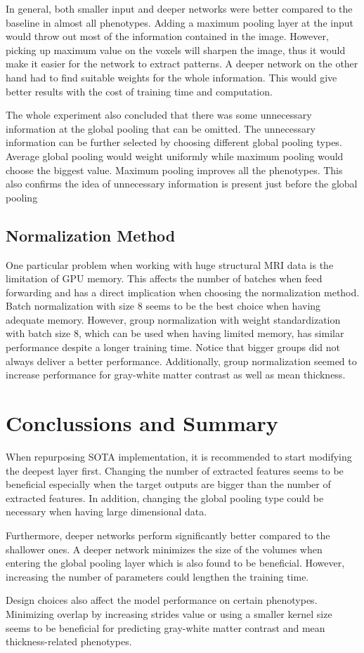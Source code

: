 \documentclass{article}
\begin{document}
    In general, both smaller input and deeper networks were better compared to the baseline in almost all phenotypes. 
    Adding a maximum pooling layer at the input would throw out most of the information contained in the image. 
    However, picking up maximum value on the voxels will sharpen the image, thus it would make it easier for the network to extract patterns. 
    A deeper network on the other hand had to find suitable weights for the whole information. 
    This would give better results with the cost of training time and computation.

    The whole experiment also concluded that there was some unnecessary information at the global pooling that can be omitted.
    The unnecessary information can be further selected by choosing different global pooling types. 
    Average global pooling would weight uniformly while maximum pooling would choose the biggest value. 
    Maximum pooling improves all the phenotypes. 
    This also confirms the idea of unnecessary information is present just before the global pooling

    \subsection*{Normalization Method}
    One particular problem when working with huge structural MRI data is the limitation of GPU memory. 
    This affects the number of batches when feed forwarding and has a direct implication when choosing the normalization method. 
    Batch normalization with size 8 seems to be the best choice when having adequate memory. 
    However, group normalization with weight standardization with batch size 8, which can be used when having limited memory, has similar performance despite a longer training time. 
    Notice that bigger groups did not always deliver a better performance. 
    Additionally, group normalization seemed to increase performance for gray-white matter contrast as well as mean thickness.

    \section*{Conclussions and Summary}
    When repurposing SOTA implementation, it is recommended to start modifying the deepest layer first. 
    Changing the number of extracted features seems to be beneficial especially when the target outputs are bigger than the number of extracted features. 
    In addition, changing the global pooling type could be necessary when having large dimensional data.

    Furthermore, deeper networks perform significantly better compared to the shallower ones. 
    A deeper network minimizes the size of the volumes when entering the global pooling layer which is also found to be beneficial. 
    However, increasing the number of parameters could lengthen the training time.
    
    Design choices also affect the model performance on certain phenotypes. 
    Minimizing overlap by increasing strides value or using a smaller kernel size seems to be beneficial for predicting gray-white matter contrast and mean thickness-related phenotypes.
    
    \printbibliography
\end{document}
